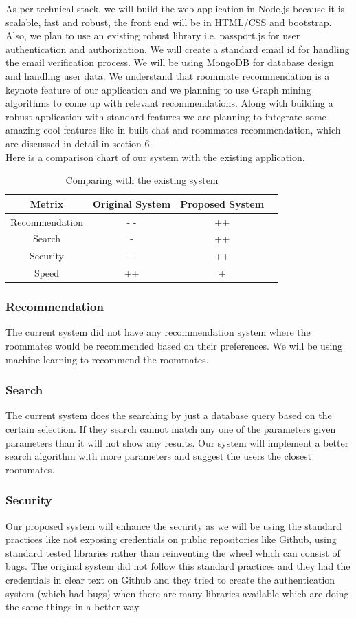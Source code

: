 \documentclass{sig-alternate-05-2015}
\begin{document}
As per technical stack, we will build the web application in Node.js because it is scalable, fast and robust, the front end will be in HTML/CSS and bootstrap. Also, we plan to use an existing robust library i.e. passport.js for user authentication and authorization. We will create a standard email id for handling the email verification process. We will be using MongoDB for database design and handling user data. We understand that roommate recommendation is a keynote feature of our application and we planning to use Graph mining algorithms to come up with relevant recommendations. Along with building a robust application with standard features we are planning to integrate some amazing cool features like in built chat and roommates recommendation, which are discussed in detail in section 6.\\

Here is a comparison chart of our system with the existing application.
\begin{table}[h]
\centering
\caption{Comparing with the existing system}
\begin{tabular}{|c|c|c|l|} \hline
Metrix&Original System&Proposed System\\ \hline
Recommendation &- -&++\\ \hline
Search &-&++\\ \hline
Security &- -&++\\ \hline
Speed &++&+\\ \hline
\end{tabular}
\end{table}

\subsubsection{Recommendation}
The current system did not have any recommendation system where the roommates would be recommended based on their preferences. We will be using machine learning to recommend the roommates. 
\subsubsection{Search}
The current system does the searching by just a database query based on the certain selection. If they search cannot match any one of the parameters given parameters than it will not show any results. Our system will implement a better search algorithm with more parameters and suggest the users the closest roommates.
\subsubsection{Security}
Our proposed system will enhance the security as we will be using the standard practices like not exposing credentials on public repositories like Github, using standard tested libraries rather than reinventing the wheel which can consist of bugs. The original system did not follow this standard practices and they had the credentials in clear text on Github and they tried to create the authentication system (which had bugs) when there are many libraries available which are doing the same things in a better way.  
\end{document}
